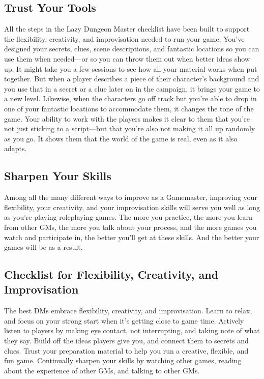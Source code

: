 \documentclass[10pt,a4paper,twoside,bg=print,twocolumn,openany,nodeprecatedcode]{dndbook}
\begin{document}
\subsection{Trust Your Tools}
All the steps in the Lazy Dungeon Master checklist have been built to support the flexibility, creativity, and improvisation needed to run your game. You've designed your secrets, clues, scene descriptions, and fantastic locations so you can use them when needed—or so you can throw them out when better ideas show up.
It might take you a few sessions to see how all your material works when put together. But when a player describes a piece of their character's background and you use that in a secret or a clue later on in the campaign, it brings your game to a new level. Likewise, when the characters go off track but you're able to drop in one of your fantastic locations to accommodate them, it changes the tone of the game.
Your ability to work with the players makes it clear to them that you're not just sticking to a script—but that you're also not making it all up randomly as you go. It shows them that the world of the game is real, even as it also adapts.
\subsection{Sharpen Your Skills}
Among all the many different ways to improve as a Gamemaster, improving your flexibility, your creativity, and your improvisation skills will serve you well as long as you're playing roleplaying games. The more you practice, the more you learn from other GMs, the more you talk about your process, and the more games you watch and participate in, the better you'll get at these skills. And the better your games will be as a result.
\subsection{Checklist for Flexibility, Creativity, and Improvisation}
The best DMs embrace flexibility, creativity, and improvisation.
Learn to relax, and focus on your strong start when it's getting close to game time.
Actively listen to players by making eye contact, not interrupting, and taking note of what they say.
Build off the ideas players give you, and connect them to secrets and clues.
Trust your preparation material to help you run a creative, flexible, and fun game.
Continually sharpen your skills by watching other games, reading about the experience of other GMs, and talking to other GMs.
\end{document}

